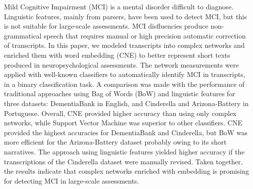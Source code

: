 Mild Cognitive Impairment (MCI) is a mental disorder difficult to diagnose. Linguistic features, mainly from parsers, have been used to detect MCI, but this is not suitable for large-scale assessments. MCI disfluencies produce non-grammatical speech that requires manual or high precision automatic correction of transcripts.  In this paper, we modeled transcripts into complex networks and enriched them with word embedding (CNE) to better represent short texts produced in neuropsychological assessments. The network measurements were applied with well-known classifiers to automatically identify MCI in transcripts, in a binary classification task. A comparison was made with the performance of traditional approaches using Bag of Words (BoW) and linguistic features for three datasets: DementiaBank in English, and Cinderella and Arizona-Battery in Portuguese. Overall, CNE provided higher accuracy than using only complex networks, while Support Vector Machine was superior to other classifiers. CNE provided the highest accuracies for DementiaBank and Cinderella, but BoW was more efficient for the Arizona-Battery dataset probably owing to its short narratives. The approach using linguistic features yielded higher accuracy if the transcriptions of the Cinderella dataset were manually revised. Taken together, the results indicate that complex networks enriched with embedding is promising for detecting MCI in large-scale assessments.
